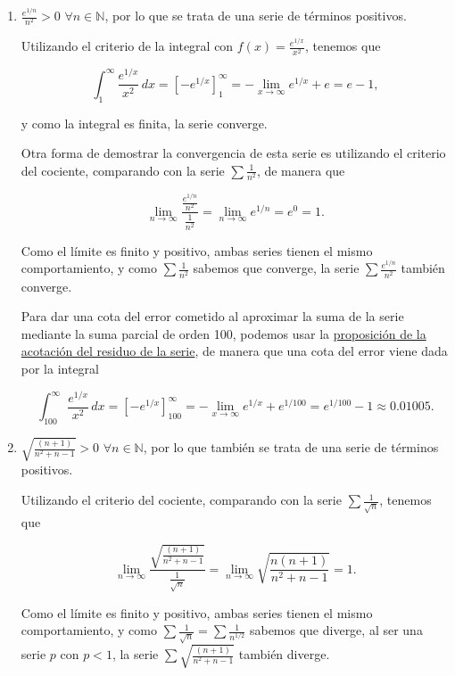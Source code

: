 \documentclass[
  spanish,
  a4paper,
]{scrreport}
\theoremstyle{definition}
\theoremstyle{remark}
\begin{document}
\begin{tcolorbox}[enhanced jigsaw, arc=.35mm, bottomrule=.15mm, bottomtitle=1mm, breakable, colback=white, colbacktitle=quarto-callout-tip-color!10!white, colframe=quarto-callout-tip-color-frame, coltitle=black, left=2mm, leftrule=.75mm, opacityback=0, opacitybacktitle=0.6, rightrule=.15mm, title=\textcolor{quarto-callout-tip-color}{\faLightbulb}\hspace{0.5em}{Solución}, titlerule=0mm, toprule=.15mm, toptitle=1mm]

\begin{enumerate}
\def\labelenumi{\alph{enumi}.}
\item
  \(\frac{e^{1/n}}{n^2} > 0\) \(\forall n \in \mathbb{N}\), por lo que
  se trata de una serie de términos positivos.

  Utilizando el criterio de la integral con
  \(f(x) = \frac{e^{1/x}}{x^2}\), tenemos que

  \[
  \int_1^\infty \frac{e^{1/x}}{x^2}\, dx
  = [-e^{1/x}]_1^\infty 
  = -\lim_{x \to \infty} e^{1/x} + e
  = e - 1,
  \]

  y como la integral es finita, la serie converge.

  Otra forma de demostrar la convergencia de esta serie es utilizando el
  criterio del cociente, comparando con la serie \(\sum \frac{1}{n^2}\),
  de manera que

  \[
  \lim_{n \to \infty} \frac{\frac{e^{1/n}}{n^2}}{\frac{1}{n^2}} 
  = \lim_{n \to \infty} e^{1/n}
  = e^0 = 1.
  \]

  Como el límite es finito y positivo, ambas series tienen el mismo
  comportamiento, y como \(\sum \frac{1}{n^2}\) sabemos que converge, la
  serie \(\sum \frac{e^{1/n}}{n^2}\) también converge.

  Para dar una cota del error cometido al aproximar la suma de la serie
  mediante la suma parcial de orden 100, podemos usar la
  \href{https://aprendeconalf.es/analisis-manual/09-series.html\#prp-residuo-acotado}{proposición
  de la acotación del residuo de la serie}, de manera que una cota del
  error viene dada por la integral

  \[
  \int_{100}^\infty \frac{e^{1/x}}{x^2}\, dx
  = [-e^{1/x}]_{100}^\infty
  = -\lim_{x \to \infty} e^{1/x} + e^{1/100}
  = e^{1/100} - 1
  \approx 0.01005.
  \]
\item
  \(\sqrt{\frac{(n+1)}{n^2+n-1}} > 0\) \(\forall n \in \mathbb{N}\), por
  lo que también se trata de una serie de términos positivos.

  Utilizando el criterio del cociente, comparando con la serie
  \(\sum \frac{1}{\sqrt{n}}\), tenemos que

  \[
  \lim_{n \to \infty} \frac{\sqrt{\frac{(n+1)}{n^2+n-1}}}{\frac{1}{\sqrt{n}}}
  = \lim_{n \to \infty} \sqrt{\frac{n(n+1)}{n^2+n-1}} 
  = 1.
  \]

  Como el límite es finito y positivo, ambas series tienen el mismo
  comportamiento, y como
  \(\sum \frac{1}{\sqrt{n}} = \sum \frac{1}{n^{1/2}}\) sabemos que
  diverge, al ser una serie \(p\) con \(p<1\), la serie
  \(\sum \sqrt{\frac{(n+1)}{n^2+n-1}}\) también diverge.
\end{enumerate}

\end{tcolorbox}
\end{document}
